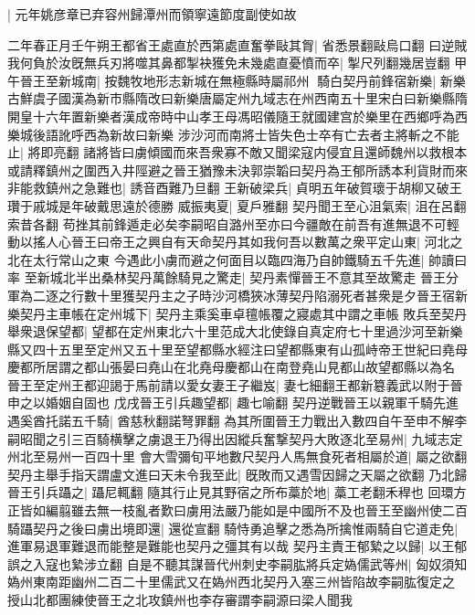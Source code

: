 |{
	元年姚彦章已弃容州歸潭州而領寧遠節度副使如故}


二年春正月壬午朔王都省王處直於西第處直奮拳敺其胷|{
	省悉景翻敺烏口翻}
曰逆賊我何負於汝旣無兵刃將噬其鼻都掣袂獲免未幾處直憂憤而卒|{
	掣尺列翻幾居豈翻}
甲午晉王至新城南|{
	按魏牧地形志新城在無極縣時屬祁州}
騎白契丹前鋒宿新樂|{
	新樂古鮮虞子國漢為新市縣隋改曰新樂唐屬定州九域志在州西南五十里宋白曰新樂縣隋開皇十六年置新樂者漢成帝時中山孝王母馮昭儀隨王就國建宫於樂里在西鄉呼為西樂城後語訛呼西為新故曰新樂}
涉沙河而南將士皆失色士卒有亡去者主將斬之不能止|{
	將即亮翻}
諸將皆曰虜傾國而來吾衆寡不敵又聞梁寇内侵宜且還師魏州以救根本或請釋鎮州之圍西入井陘避之晉王猶豫未決郭崇韜曰契丹為王郁所誘本利貨財而來非能救鎮州之急難也|{
	誘音酉難乃旦翻}
王新破梁兵|{
	貞明五年破賀瓌于胡柳又破王瓚于戚城是年破戴思遠於德勝}
威振夷夏|{
	夏戶雅翻}
契丹聞王至心沮氣索|{
	沮在呂翻索昔各翻}
苟挫其前鋒遁走必矣李嗣昭自潞州至亦曰今疆敵在前吾有進無退不可輕動以搖人心晉王曰帝王之興自有天命契丹其如我何吾以數萬之衆平定山東|{
	河北之北在太行常山之東}
今遇此小虜而避之何面目以臨四海乃自帥鐵騎五千先進|{
	帥讀曰率}
至新城北半出桑林契丹萬餘騎見之驚走|{
	契丹素憚晉王不意其至故驚走}
晉王分軍為二逐之行數十里獲契丹主之子時沙河橋狹冰薄契丹陷溺死者甚衆是夕晉王宿新樂契丹主車帳在定州城下|{
	契丹主乘奚車卓氊帳覆之寢處其中謂之車帳}
敗兵至契丹舉衆退保望都|{
	望都在定州東北六十里范成大北使錄自真定府七十里過沙河至新樂縣又四十五里至定州又五十里至望都縣水經注曰望都縣東有山孤峙帝王世紀曰堯母慶都所居謂之都山張晏曰堯山在北堯母慶都山在南登堯山見都山故望都縣以為名}
晉王至定州王都迎謁于馬前請以愛女妻王子繼岌|{
	妻七細翻王都新簒義武以附于晉申之以婚姻自固也}
戊戌晉王引兵趣望都|{
	趣七喻翻}
契丹逆戰晉王以親軍千騎先進遇奚酋托諾五千騎|{
	酋慈秋翻諾弩罪翻}
為其所圍晉王力戰出入數四自午至申不解李嗣昭聞之引三百騎横擊之虜退王乃得出因縱兵奮撃契丹大敗逐北至易州|{
	九域志定州北至易州一百四十里}
會大雪彌旬平地數尺契丹人馬無食死者相屬於道|{
	屬之欲翻}
契丹主舉手指天謂盧文進曰天未令我至此|{
	旣敗而又遇雪因歸之天屬之欲翻}
乃北歸晉王引兵躡之|{
	躡尼輒翻}
隨其行止見其野宿之所布藁於地|{
	藁工老翻禾稈也}
回環方正皆如編翦雖去無一枝亂者歎曰虜用法嚴乃能如是中國所不及也晉王至幽州使二百騎躡契丹之後曰虜出境即還|{
	還從宣翻}
騎恃勇追擊之悉為所擒惟兩騎自它道走免|{
	進軍易退軍難退而能整是難能也契丹之彊其有以哉}
契丹主責王郁縶之以歸|{
	以王郁誤之入寇也縶涉立翻}
自是不聽其謀晉代州刺史李嗣肱將兵定媯儒武等州|{
	匈奴須知媯州東南距幽州二百二十里儒武又在媯州西北契丹入塞三州皆陷故李嗣肱復定之}
授山北都團練使晉王之北攻鎮州也李存審謂李嗣源曰梁人聞我


